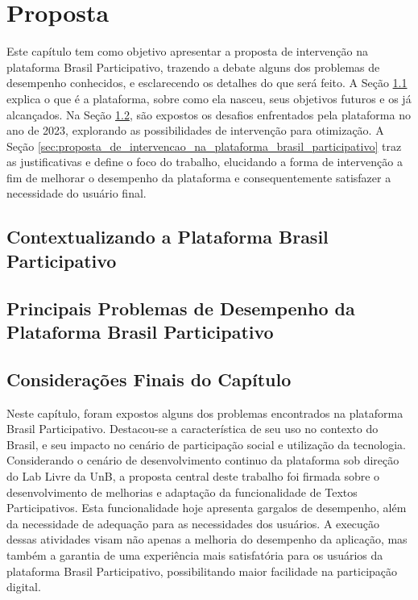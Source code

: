 \chapter{Proposta}

Este capítulo tem como objetivo apresentar a proposta de intervenção na plataforma Brasil Participativo, trazendo a debate alguns dos problemas de desempenho conhecidos, e esclarecendo os detalhes do que será feito. A Seção \ref{sec:contextualizando_a_plataforma_brasil_participativo} explica o que é a plataforma, sobre como ela nasceu, seus objetivos futuros e os já alcançados. Na Seção \ref{sec:principais_problemas_de_desempenho_da_plataforma_brasil_participativo}, são expostos os desafios enfrentados pela plataforma no ano de 2023, explorando as possibilidades de intervenção para otimização. A Seção \ref{sec:proposta_de_intervencao_na_plataforma_brasil_participativo} traz as justificativas e define o foco do trabalho, elucidando a forma de intervenção a fim de melhorar o desempenho da plataforma e consequentemente satisfazer a necessidade do usuário final.

\section{Contextualizando a Plataforma Brasil Participativo}
\label{sec:contextualizando_a_plataforma_brasil_participativo}



\section{Principais Problemas de Desempenho da Plataforma Brasil Participativo}
\label{sec:principais_problemas_de_desempenho_da_plataforma_brasil_participativo}



\section{Considerações Finais do Capítulo}

Neste capítulo, foram expostos alguns dos problemas encontrados na plataforma Brasil Participativo. Destacou-se a característica de seu uso no contexto do Brasil, e seu impacto no cenário de participação social e utilização da tecnologia. Considerando o cenário de desenvolvimento continuo da plataforma sob direção do Lab Livre da UnB, a proposta central deste trabalho foi firmada sobre o desenvolvimento de melhorias e adaptação da funcionalidade de Textos Participativos. Esta funcionalidade hoje apresenta gargalos de desempenho, além da necessidade de adequação para as necessidades dos usuários. A execução dessas atividades visam não apenas a melhoria do desempenho da aplicação, mas também a garantia de uma experiência mais satisfatória para os usuários da plataforma Brasil Participativo, possibilitando maior facilidade na participação digital.